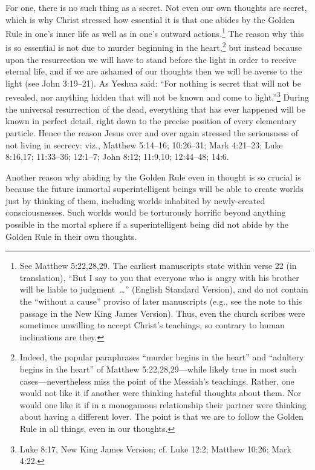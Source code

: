 \documentclass[letterpaper,12pt]{article}
\begin{document}
For one, there is no such thing as a secret. Not even our own thoughts are secret, which is why Christ stressed how essential it is that one abides by the Golden Rule in one's inner life as well as in one's outward actions.\footnote{See Matthew 5:22,28,29. The earliest manuscripts state within verse 22 (in translation), ``But I say to you that everyone who is angry with his brother will be liable to judgment~\ldots'' (English Standard Version), and do not contain the ``without a cause'' proviso of later manuscripts (e.g., see the note to this passage in the New King James Version). Thus, even the church scribes were sometimes unwilling to accept Christ's teachings, so contrary to human inclinations are they.} The reason why this is so essential is not due to murder beginning in the heart,\footnote{Indeed, the popular paraphrases ``murder begins in the heart'' and ``adultery begins in the heart'' of Matthew 5:22,28,29---while likely true in most such cases---nevertheless miss the point of the Messiah's teachings. Rather, one would not like it if another were thinking hateful thoughts about them. Nor would one like it if in a monogamous relationship their partner were thinking about having a different lover. The point is that we are to follow the Golden Rule in all things, even in our thoughts.} but instead because upon the resurrection we will have to stand before the light in order to receive eternal life, and if we are ashamed of our thoughts then we will be averse to the light (see John 3:19--21). As Yeshua said: ``For nothing is secret that will not be revealed, nor anything hidden that will not be known and come to light.''\footnote{Luke 8:17, New King James Version; cf. Luke 12:2; Matthew 10:26; Mark 4:22.} During the universal resurrection of the dead, everything that has ever happened will be known in perfect detail, right down to the precise position of every elementary particle. Hence the reason Jesus over and over again stressed the seriousness of not living in secrecy: viz., Matthew 5:14--16; 10:26--31; Mark 4:21--23; Luke 8:16,17; 11:33--36; 12:1--7; John 8:12; 11:9,10; 12:44--48; 14:6.

Another reason why abiding by the Golden Rule even in thought is so crucial is because the future immortal superintelligent beings will be able to create worlds just by thinking of them, including worlds inhabited by newly-created consciousnesses. Such worlds would be torturously horrific beyond anything possible in the mortal sphere if a superintelligent being did not abide by the Golden Rule in their own thoughts.
\end{document}
